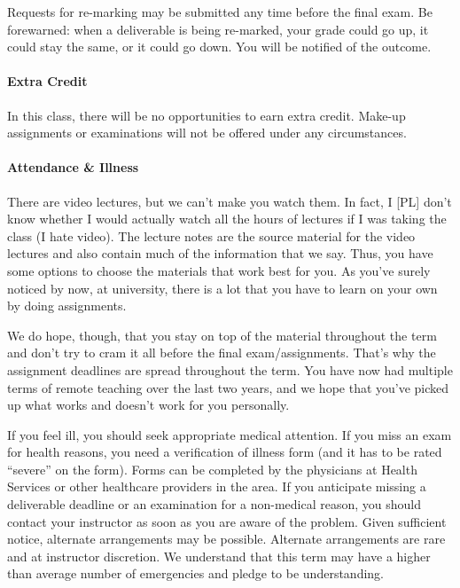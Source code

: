Requests for re-marking may be submitted any time before the final exam. Be forewarned: when a deliverable is being re-marked, your grade could go up, it could stay the same, or it could go down. You will be notified of the outcome.

\paragraph{Extra Credit}
In this class, there will be no opportunities to earn extra credit. Make-up assignments or examinations will not be offered under any circumstances.

\paragraph{Attendance \& Illness}

There are video lectures, but we can't make you watch them. In fact, I [PL] don't know whether I would actually watch all the hours of lectures if I was taking the class (I hate video). The lecture notes are the source material for the video lectures and also contain much of the information that we say. Thus, you have some options to choose the materials that work best for you. As you've surely noticed by now, at university, there is a lot that you have to learn on your own by doing assignments.

We do hope, though, that you stay on top of the material throughout the term and don't try to cram it all before the final exam/assignments. That's why the assignment deadlines are spread throughout the term. You have now had multiple terms of remote teaching over the last two years, and we hope that you've picked up what works and doesn't work for you personally.



If you feel ill, you should seek appropriate medical attention. If you miss an exam for health reasons, you need a verification of illness form (and it has to be rated ``severe'' on the form). Forms can be completed by the physicians at Health Services or other healthcare providers in the area. If you anticipate missing a deliverable deadline or an examination for a non-medical reason, you should contact your instructor as soon as you are aware of the problem. Given sufficient notice, alternate arrangements may be possible. Alternate arrangements are rare and at instructor discretion. We understand that this term may have a higher than average number of emergencies and pledge to be understanding.

